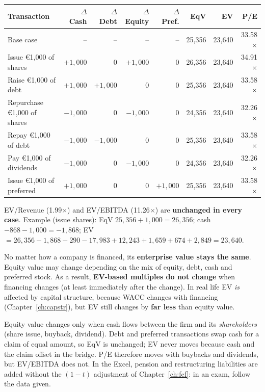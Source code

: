 \begin{exbox}
\small
\begin{tabular}{@{}lrrrrrrr@{}}
\toprule
Transaction & $\Delta$Cash & $\Delta$Debt & $\Delta$Equity & $\Delta$Pref. & \textbf{EqV} & \textbf{EV} & \textbf{P/E}\\
\midrule
Base case & -- & -- & -- & -- & 25,356 & 23,640 & 33.58$\times$\\
Issue \euro1,000 of shares & $+1{,}000$ & 0 & $+1{,}000$ & 0 & 26,356 & 23,640 & 34.91$\times$\\
Raise \euro1,000 of debt & $+1{,}000$ & $+1{,}000$ & 0 & 0 & 25,356 & 23,640 & 33.58$\times$\\
Repurchase \euro1,000 of shares & $-1{,}000$ & 0 & $-1{,}000$ & 0 & 24,356 & 23,640 & 32.26$\times$\\
Repay \euro1,000 of debt & $-1{,}000$ & $-1{,}000$ & 0 & 0 & 25,356 & 23,640 & 33.58$\times$\\
Pay \euro1,000 of dividends & $-1{,}000$ & 0 & $-1{,}000$ & 0 & 24,356 & 23,640 & 32.26$\times$\\
Issue \euro1,000 of preferred & $+1{,}000$ & 0 & 0 & $+1{,}000$ & 25,356 & 23,640 & 33.58$\times$\\
\bottomrule
\end{tabular}

\medskip
EV/Revenue (1.99$\times$) and EV/EBITDA (11.26$\times$) are \textbf{unchanged in every case}. Example (issue shares): EqV $25{,}356+1{,}000=26{,}356$; cash $-868-1{,}000=-1{,}868$; EV $=26{,}356-1{,}868-290-17{,}983+12{,}243+1{,}659+674+2{,}849=23{,}640$.
\end{exbox}
\begin{keybox}
No matter how a company is financed, its \textbf{enterprise value stays the same}. Equity value may change depending on the mix of equity, debt, cash and preferred stock. As a result, \textbf{EV-based multiples do not change} when financing changes (at least immediately after the change). In real life EV \emph{is} affected by capital structure, because WACC changes with financing (Chapter~\ref{ch:capstr}), but EV still changes by \textbf{far less} than equity value.
\end{keybox}
\begin{addbox}
Equity value changes only when cash flows between the firm and its \emph{shareholders} (share issue, buyback, dividend). Debt and preferred transactions swap cash for a claim of equal amount, so EqV is unchanged; EV never moves because cash and the claim offset in the bridge. P/E therefore moves with buybacks and dividends, but EV/EBITDA does not. In the Excel, pension and restructuring liabilities are added without the $(1-t)$ adjustment of Chapter~\ref{ch:fcf}: in an exam, follow the data given.
\end{addbox}

